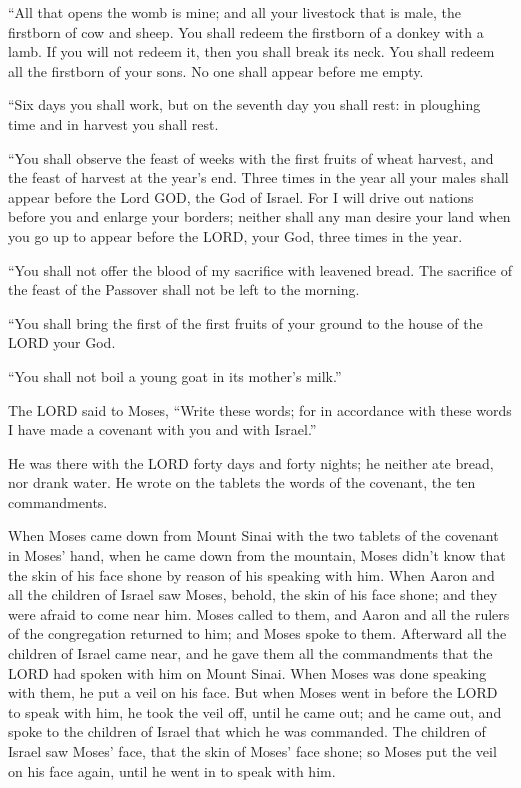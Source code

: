  ``All that opens the womb is mine; and all your livestock
that is male, the firstborn of cow and sheep.  You shall
redeem the firstborn of a donkey with a lamb. If you will not redeem it,
then you shall break its neck. You shall redeem all the firstborn of
your sons. No one shall appear before me empty.

 ``Six days you shall work, but on the seventh day you
shall rest: in ploughing time and in harvest you shall rest.

 ``You shall observe the feast of weeks with the first
fruits of wheat harvest, and the feast of harvest at the year's end.
 Three times in the year all your males shall appear before
the Lord GOD, the God of Israel.  For I will drive out
nations before you and enlarge your borders; neither shall any man
desire your land when you go up to appear before the LORD, your God,
three times in the year.

 ``You shall not offer the blood of my sacrifice with
leavened bread. The sacrifice of the feast of the Passover shall not be
left to the morning.

 ``You shall bring the first of the first fruits of your
ground to the house of the LORD your God.

``You shall not boil a young goat in its mother's milk.''

 The LORD said to Moses, ``Write these words; for in
accordance with these words I have made a covenant with you and with
Israel.''

 He was there with the LORD forty days and forty nights; he
neither ate bread, nor drank water. He wrote on the tablets the words of
the covenant, the ten commandments.

 When Moses came down from Mount Sinai with the two tablets
of the covenant in Moses' hand, when he came down from the mountain,
Moses didn't know that the skin of his face shone by reason of his
speaking with him.  When Aaron and all the children of
Israel saw Moses, behold, the skin of his face shone; and they were
afraid to come near him.  Moses called to them, and Aaron
and all the rulers of the congregation returned to him; and Moses spoke
to them.  Afterward all the children of Israel came near,
and he gave them all the commandments that the LORD had spoken with him
on Mount Sinai.  When Moses was done speaking with them, he
put a veil on his face.  But when Moses went in before the
LORD to speak with him, he took the veil off, until he came out; and he
came out, and spoke to the children of Israel that which he was
commanded.  The children of Israel saw Moses' face, that
the skin of Moses' face shone; so Moses put the veil on his face again,
until he went in to speak with him.

